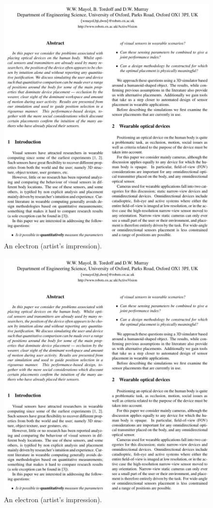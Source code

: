\begin{figure}[htbp]
	\centering
		\includegraphics[page=4]{Figures/mayol_etal_ouel224101_cropped.pdf}
	\caption[An Electron]{An electron (artist's impression).}
	\label{fig:Electron}
\end{figure}

\begin{figure}[htbp]
	\centering
		\includegraphics[page=5]{Figures/mayol_etal_ouel224101_cropped.pdf}
	\caption[An Electron]{An electron (artist's impression).}
	\label{fig:Electron}
\end{figure}

